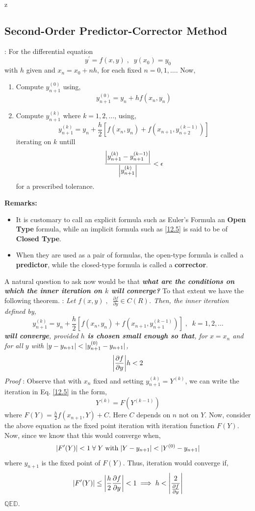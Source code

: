 z\documentclass[a4paper,12pt,twoside]{book}
\newcommand{\nll}[0]{\newline\newline}
\newcommand{\tit}[1]{\textit{#1}}
\newcommand{\theor}[1]{\boxed{\textbf{\textit{Theorem \thechapter.#1}}}}
\newcommand{\algo}[0]{\boxed{\textbf{\textit{Algorithm}}}}
\DeclarePairedDelimiter\abs{\lvert}{\rvert}
\newcommand{\pder}[2]{\frac{\partial #1}{\partial #2}}
\renewcommand{\d}[0]{\prime}
\begin{document}
\subsection{Second-Order Predictor-Corrector Method}
\algo  : For the differential equation
\[y^\d = f(x,y)\;,\;\; y(x_0) = y_0\]
with $h$ given and $x_n = x_0 + nh$, for each fixed $n=0,1,\dots$. Now,
\begin{enumerate}
    \item {Compute $y_{n+1}^{(0)}$ using,
    \[y_{n+1}^{(0)} = y_n + hf(x_n,y_n)\]
    }
    \item{Compute $y_{n+1}^{(k)}$ where $k=1,2,\dots$, using,
    \[ y_{n+1}^{(k)} = y_n + \frac{h}{2} \left[ f(x_n,y_n) + f(x_{n+1},y_{n+2}^{(k-1)}) \right] \]
    iterating on $k$ untill
    \[\frac{\abs*{y_{n+1}^{(k)} - y_{n+1}^{(k-1)} }}{\abs*{y_{n+1}^{(k)}}} < \epsilon\]
    for a prescribed tolerance.
    }
\end{enumerate}
\textbf{Remarks:}
\begin{itemize}
    \item {It is customary to call an explicit formula such as Euler's Formula an \textbf{Open Type} formula, while an implicit formula such as \ref{12.5} is said to be of \textbf{Closed Type}.}
    \item{When they are used as a pair of formulas, the open-type formula is called a \textbf{predictor}, while the closed-type formula is called a \textbf{corrector}.}
\end{itemize}
A natural question to ask now would be that \textbf{\textit{what are the conditions on which the inner iteration on $k$ will converge?}}
\nll
To that extent we have the following theorem.
\nll
\theor{15} : \tit{Let $f(x,y)\;,\;\;\pder{f}{y} \in C(R)$. Then, the inner iteration defined by,
\[y_{n+1}^{(k)} = y_n + \frac{h}{2}\left[ f(x_n,y_n) + f(x_{n+1},y_{n+1}^{(k-1)}) \right]\;,\;\; k=1,2,\dots\]
\textbf{will converge}, provided \textbf{$h$ is chosen small enough so that}, for $x=x_n$ and for all $y$ with $\abs{y-y_{n+1}} < \abs{y_{n+1}^{(0)} - y_{n+1}}$,
\[\abs*{\pder{f}{y}}h < 2\]
}
\tit{Proof} : Observe that with $x_n$ fixed and setting $y_{n+1}^{(k)} = Y^{(k)}$, we can write the iteration in Eq. \ref{12.5} in the form,
\[ Y^{(k)} = F\left(Y^{(k-1)}\right) \]
where $F(Y) = \frac{h}{2} f(x_{n+1}, Y) + C$. Here $C$ depends on $n$ not on $Y$. 
\nll
Now, consider the above equation as the fixed point iteration with iteration function $F(Y)$. Now, since we know that this would converge when,
\[\abs*{F^\d(Y)}<1\;\forall \; Y\;\text{with}\;\abs{Y- y_{n+1}} < \abs{Y^{(0)} - y_{n+1}}\]
where $y_{n+1}$ is the fixed point of $F(Y)$.
\nll
Thus, iteration would converge if,
\[\abs{F^\d(Y)} \le \abs*{\frac{h}{2}\pder{f}{y}}< 1 \implies h< \abs*{\frac{2}{\pder{f}{y}}}\]
$\mathbb{QED}$.
\end{document}
